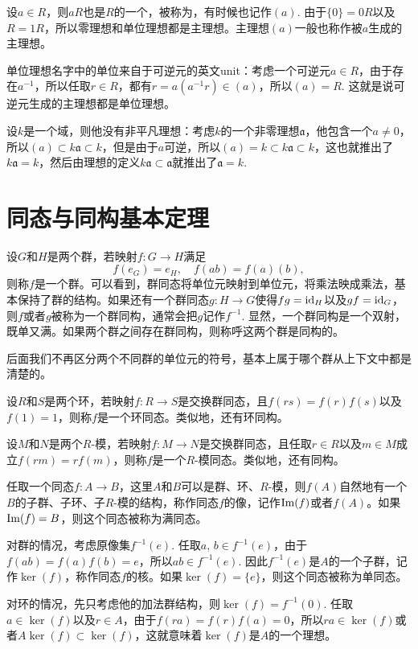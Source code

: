 设$a\in R$，则$aR$也是$R$的一个，被称为，有时候也记作$(a)$. 由于$\{0\}=0R$以及$R=1R$，所以零理想和单位理想都是主理想。主理想$(a)$一般也称作被$a$生成的主理想。

单位理想名字中的单位来自于可逆元的英文unit：考虑一个可逆元$a\in R$，由于存在$a^{-1}$，所以任取$r\in R$，都有$r=a(a^{-1}r)\in (a)$，所以$(a)=R$. 这就是说可逆元生成的主理想都是单位理想。

设$k$是一个域，则他没有非平凡理想：考虑$k$的一个非零理想$\mathfrak{a}$，他包含一个$a\neq 0$，所以$(a)\subset k\mathfrak{a} \subset k$，但是由于$a$可逆，所以$(a)=k\subset k\mathfrak{a} \subset k$，这也就推出了$k\mathfrak{a}=k$，然后由理想的定义$k\mathfrak{a}\subset \mathfrak{a}$就推出了$\mathfrak{a}=k$.

\section{同态与同构基本定理}

\para 设$G$和$H$是两个群，若映射$f:G\to H$满足
\[
	f(e_G)=e_H,\quad f(ab)=f(a)(b),
\]
则称$f$是一个群。可以看到，群同态将单位元映射到单位元，将乘法映成乘法，基本保持了群的结构。如果还有一个群同态$g:H\to G$使得$fg=\operatorname{id}_H$以及$gf=\operatorname{id}_G$，则$f$或者$g$被称为一个群同构，通常会把$g$记作$f^{-1}$. 显然，一个群同构是一个双射，既单又满。如果两个群之间存在群同构，则称呼这两个群是同构的。

后面我们不再区分两个不同群的单位元的符号，基本上属于哪个群从上下文中都是清楚的。

\para 设$R$和$S$是两个环，若映射$f:R\to S$是交换群同态，且$f(rs)=f(r)f(s)$以及$f(1)=1$，则称$f$是一个环同态。类似地，还有环同构。

设$M$和$N$是两个$R$-模，若映射$f:M\to N$是交换群同态，且任取$r\in R$以及$m\in M$成立$f(rm)=rf(m)$，则称$f$是一个$R$-模同态。类似地，还有同构。

\para 任取一个同态$f:A\to B$，这里$A$和$B$可以是群、环、$R$-模，则$f(A)$自然地有一个$B$的子群、子环、子$R$-模的结构，称作同态$f$的像，记作$\operatorname{Im}(f)$或者$f(A)$。如果$\operatorname{Im}(f)=B$，则这个同态被称为满同态。

对群的情况，考虑原像集$f^{-1}(e)$. 任取$a$, $b\in f^{-1}(e)$，由于$f(ab)=f(a)f(b)=e$，所以$ab\in f^{-1}(e)$. 因此$f^{-1}(e)$是$A$的一个子群，记作$\ker(f)$，称作同态$f$的核。如果$\ker(f)=\{e\}$，则这个同态被称为单同态。

对环的情况，先只考虑他的加法群结构，则$\ker(f)=f^{-1}(0)$. 任取$a\in \ker(f)$以及$r\in A$，由于$f(ra)=f(r)f(a)=0$，所以$ra\in \ker(f)$或者$A\ker(f)\subset \ker(f)$，这就意味着$\ker(f)$是$A$的一个理想。

